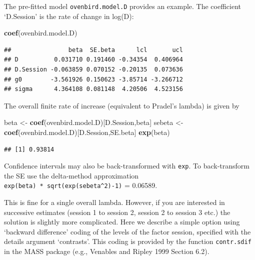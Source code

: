 \documentclass[
]{book}
\newenvironment{Shaded}{\begin{snugshade}}{\end{snugshade}}
\newcommand{\FunctionTok}[1]{\textcolor[rgb]{0.13,0.29,0.53}{\textbf{#1}}}
\newcommand{\NormalTok}[1]{#1}
\newcommand{\OtherTok}[1]{\textcolor[rgb]{0.56,0.35,0.01}{#1}}
\newcommand{\StringTok}[1]{\textcolor[rgb]{0.31,0.60,0.02}{#1}}
\begin{document}
The pre-fitted model \texttt{ovenbird.model.D} provides an example. The coefficient `D.Session' is the rate of change in log(D):

\begin{Shaded}
\begin{Highlighting}[]
\FunctionTok{coef}\NormalTok{(ovenbird.model.D)}
\end{Highlighting}
\end{Shaded}

\begin{verbatim}
##                beta  SE.beta      lcl       ucl
## D          0.031710 0.191460 -0.34354  0.406964
## D.Session -0.063859 0.070152 -0.20135  0.073636
## g0        -3.561926 0.150623 -3.85714 -3.266712
## sigma      4.364108 0.081148  4.20506  4.523156
\end{verbatim}

The overall finite rate of increase (equivalent to Pradel's lambda) is given by

\begin{Shaded}
\begin{Highlighting}[]
\NormalTok{beta }\OtherTok{\textless{}{-}} \FunctionTok{coef}\NormalTok{(ovenbird.model.D)[}\StringTok{\textquotesingle{}D.Session\textquotesingle{}}\NormalTok{,}\StringTok{\textquotesingle{}beta\textquotesingle{}}\NormalTok{]}
\NormalTok{sebeta }\OtherTok{\textless{}{-}} \FunctionTok{coef}\NormalTok{(ovenbird.model.D)[}\StringTok{\textquotesingle{}D.Session\textquotesingle{}}\NormalTok{,}\StringTok{\textquotesingle{}SE.beta\textquotesingle{}}\NormalTok{]}
\FunctionTok{exp}\NormalTok{(beta)}
\end{Highlighting}
\end{Shaded}

\begin{verbatim}
## [1] 0.93814
\end{verbatim}

Confidence intervals may also be back-transformed with \texttt{exp}. To back-transform the SE use the delta-method approximation \texttt{exp(beta)\ *\ sqrt(exp(sebeta\^{}2)-1)} = 0.06589.

This is fine for a single overall lambda. However, if you are interested in successive estimates (session 1 to session 2, session 2 to session 3 etc.) the solution is slightly more complicated. Here we describe a simple option using `backward difference' coding of the levels of the factor session, specified with the details argument `contrasts'. This coding is provided by the function \texttt{contr.sdif} in the MASS package (e.g., Venables and Ripley 1999 Section 6.2).
\end{document}
